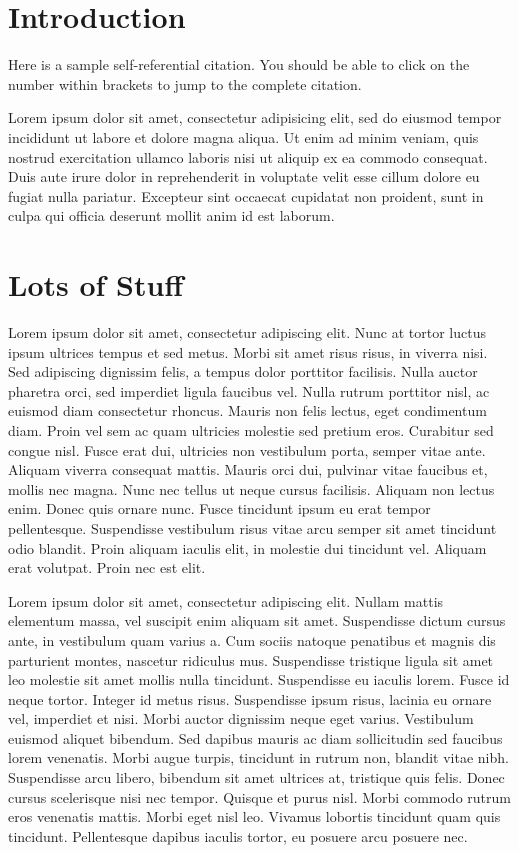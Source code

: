 \documentclass{chi-ext}
\begin{document}
\begin{multicols}{2}
\section{Introduction}

Here \cite{chi_extended_template} is a sample self-referential citation. You should be able to click
on the number within brackets to jump to the complete citation.

Lorem ipsum dolor sit amet, consectetur adipisicing elit, sed do eiusmod tempor incididunt ut labore
et dolore magna aliqua. Ut enim ad minim veniam, quis nostrud exercitation ullamco laboris nisi ut
aliquip ex ea commodo consequat. Duis aute irure dolor in reprehenderit in voluptate velit esse
cillum dolore eu fugiat nulla pariatur. Excepteur sint occaecat cupidatat non proident, sunt in
culpa qui officia deserunt mollit anim id est laborum.

\section{Lots of Stuff}

Lorem ipsum dolor sit amet, consectetur adipiscing elit. Nunc at tortor luctus ipsum ultrices tempus
et sed metus. Morbi sit amet risus risus, in viverra nisi. Sed adipiscing dignissim felis, a tempus
dolor porttitor facilisis. Nulla auctor pharetra orci, sed imperdiet ligula faucibus vel. Nulla
rutrum porttitor nisl, ac euismod diam consectetur rhoncus. Mauris non felis lectus, eget
condimentum diam. Proin vel sem ac quam ultricies molestie sed pretium eros. Curabitur sed congue
nisl. Fusce erat dui, ultricies non vestibulum porta, semper vitae ante. Aliquam viverra consequat
mattis. Mauris orci dui, pulvinar vitae faucibus et, mollis nec magna. Nunc nec tellus ut neque
cursus facilisis. Aliquam non lectus enim. Donec quis ornare nunc. Fusce tincidunt ipsum eu erat
tempor pellentesque. Suspendisse vestibulum risus vitae arcu semper sit amet tincidunt odio blandit.
Proin aliquam iaculis elit, in molestie dui tincidunt vel. Aliquam erat volutpat. Proin nec est
elit.

Lorem ipsum dolor sit amet, consectetur adipiscing elit. Nullam mattis elementum massa, vel suscipit
enim aliquam sit amet. Suspendisse dictum cursus ante, in vestibulum quam varius a. Cum sociis
natoque penatibus et magnis dis parturient montes, nascetur ridiculus mus. Suspendisse tristique
ligula sit amet leo molestie sit amet mollis nulla tincidunt. Suspendisse eu iaculis lorem. Fusce id
neque tortor. Integer id metus risus. Suspendisse ipsum risus, lacinia eu ornare vel, imperdiet et
nisi. Morbi auctor dignissim neque eget varius. Vestibulum euismod aliquet bibendum. Sed dapibus
mauris ac diam sollicitudin sed faucibus lorem venenatis. Morbi augue turpis, tincidunt in rutrum
non, blandit vitae nibh. Suspendisse arcu libero, bibendum sit amet ultrices at, tristique quis
felis. Donec cursus scelerisque nisi nec tempor. Quisque et purus nisl. Morbi commodo rutrum eros
venenatis mattis. Morbi eget nisl leo. Vivamus lobortis tincidunt quam quis tincidunt. Pellentesque
dapibus iaculis tortor, eu posuere arcu posuere nec.


\end{multicols}
\end{document}
